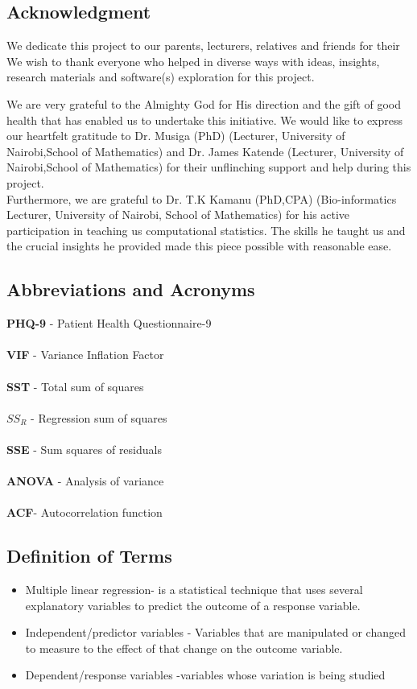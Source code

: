 \documentclass[11pt]{article}\usepackage[]{graphicx}\usepackage[]{xcolor}
\numberwithin{equation}{section}
\numberwithin{table}{section}
\begin{document}
	\newpage
	
	\subsection{Acknowledgment}
	We dedicate this project to our parents, lecturers, relatives and friends for their We wish to thank everyone who helped in diverse ways with ideas, insights, research materials and software(s) exploration for this project.
	
	\noindent We are very grateful to the Almighty God for His direction and the gift of good health that has enabled us to undertake this initiative. We would like to express our heartfelt gratitude to Dr. Musiga (PhD) (Lecturer, University of Nairobi,School of Mathematics) and Dr. James Katende (Lecturer, University of Nairobi,School of Mathematics) for their unflinching support and help during this project.\\
	Furthermore, we are grateful to Dr. T.K Kamanu (PhD,CPA) (Bio-informatics Lecturer, University of Nairobi, School of Mathematics) for his active participation in teaching us computational statistics. The skills he taught us and the crucial insights he provided made this piece possible with reasonable ease. 
	\newpage
\tableofcontents
	\newpage
	\subsection{Abbreviations and Acronyms}
	\textbf{PHQ-9} - Patient Health Questionnaire-9 \\\\
	\textbf{VIF} - Variance Inflation Factor\\\\
	\textbf{SST} - Total sum of squares \\\\
	\textbf{$SS_{R}$} - Regression sum of squares\\\\
	\textbf{SSE} - Sum squares of residuals \\\\
	\textbf{ANOVA} - Analysis of variance\\\\
	\textbf{ACF}- Autocorrelation function 
	
	\newpage
	
	\subsection{Definition of Terms}
	\begin{itemize}
		\item  Multiple linear regression- is a statistical technique that uses several explanatory variables to predict the outcome of a response variable.
		\item Independent/predictor variables - Variables that are manipulated or changed to measure to the effect of that change on the outcome variable.
		\item Dependent/response variables -variables whose variation is being studied
		
		
	\end{itemize}
	
\end{document}

